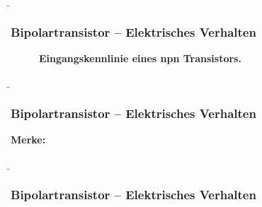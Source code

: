 \begin{frame}
    \b{ \frametitle{Bipolartransistor -- Elektrisches Verhalten}
        \begin{figure}[H]
            \centering
            \begin{minipage}[c]{0.48\textwidth}
                \raggedright
                \scalebox{0.95}{}
            \end{minipage}
            \begin{minipage}[c]{0.48\textwidth}
                \raggedleft
                \scalebox{1}{}
            \end{minipage}
            
            \caption{\textbf{Eingangskennlinie eines npn Transistors.} }  
            \label{fig:EingangskennlinieEinesNpnTransistorsFolie}
        \end{figure}
        \begin{itemize}
        \end{itemize}
    }
\end{frame}

\begin{frame}
    \b{\frametitle{Bipolartransistor -- Elektrisches Verhalten}
        \textbf{Merke:}
        \begin{itemize}
        \end{itemize}
        }
\end{frame}

\begin{frame}
    \b{ \frametitle{Bipolartransistor -- Elektrisches Verhalten}
        \begin{figure}[H]
            \centering
            
        \end{figure}}
\end{frame}

